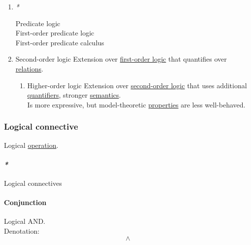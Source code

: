 \documentclass[11pt]{article}
\begin{document}
\begin{enumerate}
\item \emph{*}
\label{sec:org99b3871}

\label{org15755ef}Predicate logic\\
\label{orgdc298dc}First-order predicate logic\\
\label{orgbd95117}First-order predicate calculus\\

\item \label{orgc2f2287}Second-order logic
\label{sec:orgb8e4b8f}
Extension over \hyperref[orgc8d3455]{first-order logic} that quantifies over \hyperref[org5e14e7d]{relations}.\\

\begin{enumerate}
\item \label{org61744e7}Higher-order logic
\label{sec:orge14c6d7}
Extension over \hyperref[orgc2f2287]{second-order logic} that uses additional \hyperref[orga67c681]{quantifiers}, stronger \hyperref[org2f919bf]{semantics}.\\

Is more expressive, but model-theoretic \hyperref[org763ad6b]{properties} are less well-behaved.\\
\end{enumerate}
\end{enumerate}

\subsubsection{\label{org558388e}Logical connective}
\label{sec:org7702425}
Logical \hyperref[org87d485b]{operation}.\\

\paragraph{\emph{*}}
\label{sec:org091bc56}

\label{org244a341}Logical connectives\\

\paragraph{\label{org19fd1b3}Conjunction}
\label{sec:org6614379}
Logical AND.\\

Denotation:\\
$$ \land $$\\
\end{document}
